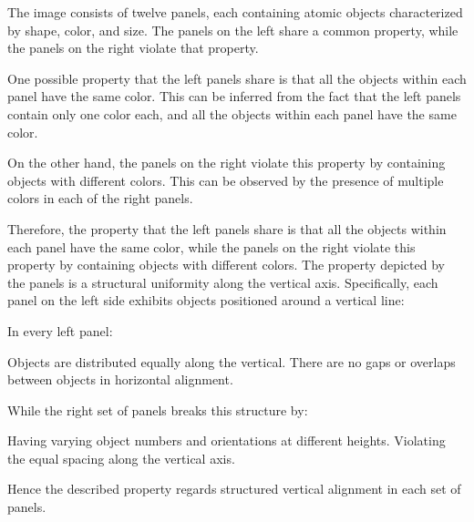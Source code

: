 \begin{tcolorbox}[breakable,enhanced jigsaw,opacityback=0,]
	\centering
	\begin{dialogue}
		 The image consists of twelve panels, each containing atomic objects characterized by shape, color, and size. The panels on the left share a common property, while the panels on the right violate that property.
		
		One possible property that the left panels share is that all the objects within each panel have the same color. This can be inferred from the fact that the left panels contain only one color each, and all the objects within each panel have the same color.
		
		On the other hand, the panels on the right violate this property by containing objects with different colors. This can be observed by the presence of multiple colors in each of the right panels.
		
		Therefore, the property that the left panels share is that all the objects within each panel have the same color, while the panels on the right violate this property by containing objects with different colors.
		\vspace{1em}
		 
		\vspace{1em}
		 The property depicted by the panels is a structural uniformity along the vertical axis. Specifically, each panel on the left side exhibits objects positioned around a vertical line:
		
		In every left panel:
		
		Objects are distributed equally along the vertical.
		There are no gaps or overlaps between objects in horizontal alignment.
		
		While the right set of panels breaks this structure by:
		
		Having varying object numbers and orientations at different heights.
		Violating the equal spacing along the vertical axis.
		
		Hence the described property regards structured vertical alignment in each set of panels.
	\end{dialogue}
	\label{fig:baseline}
\end{tcolorbox}




